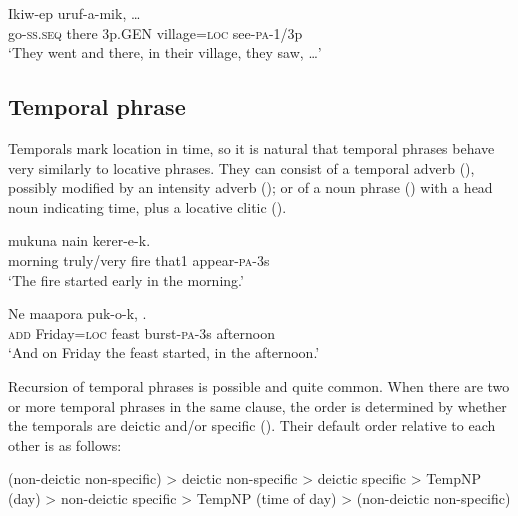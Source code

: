 \ea%
\label{ex:x869}
\gll Ikiw-ep      uruf-a-mik,  {\dots }\\
   go-\textsc{ss}.\textsc{seq}  there  3p.GEN  village=\textsc{loc}  see-\textsc{pa}-1/3p   \\
\glt`They went and there, in their village, they saw, {\dots}'
\z





\subsection{Temporal phrase}
{}
Temporals mark location in time, so it is natural that temporal phrases behave very similarly to locative phrases.  They can consist of a temporal adverb (), possibly modified by an intensity adverb (); or of a noun phrase () with a head noun indicating time, plus a locative clitic ().

\ea%
\label{ex:x872}
\gll {}   mukuna  nain  kerer-e-k. \\
    morning  truly/very  fire  that1  appear-\textsc{pa}-3s  \\
\glt`The fire started early in the morning.'
\z





\ea%
\label{ex:x873}
\gll Ne    maapora  puk-o-k,  . \\
   \textsc{add}  Friday=\textsc{loc}  feast  burst-\textsc{pa}-3s  afternoon   \\
\glt`And on Friday the feast started, in the afternoon.'
\z





Recursion of temporal phrases is possible and quite common.  When there are two or more temporal phrases in the same clause, the order is determined by whether the temporals are deictic and/or specific ().  Their default order relative to each other is as follows:

(non-deictic non-specific) {{\textgreater}} deictic non-specific {{\textgreater}} deictic specific {{\textgreater}} TempNP (day) {{\textgreater}} non-deictic specific {{\textgreater}} TempNP (time of day) {{\textgreater}} (non-deictic non-specific)

